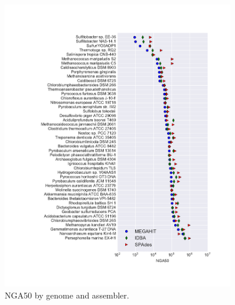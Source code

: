 \documentclass[10pt,a4paper,twocolumn]{article}
\begin{document}
{\small }

\bigskip









\newpage

\begin{figure}[!h]
\centering
\includegraphics[width=0.9\textwidth]{nga50.pdf}  
\caption{NGA50 by genome and assembler.}
\label{fig:nga50}
\end{figure}
\end{document}
